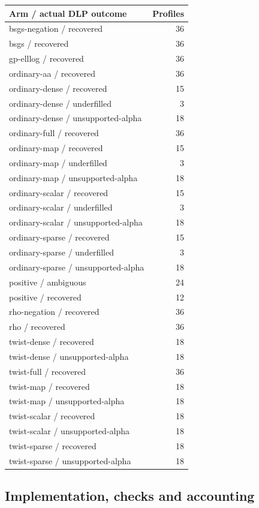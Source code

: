 \documentclass[
  10pt,
]{article}
\begin{document}
\begin{longtable}[]{@{}lr@{}}
\toprule\noalign{}
Arm / actual DLP outcome & Profiles \\
\midrule\noalign{}
\endhead
\bottomrule\noalign{}
\endlastfoot
bsgs-negation / recovered & 36 \\
bsgs / recovered & 36 \\
gp-elllog / recovered & 36 \\
ordinary-aa / recovered & 36 \\
ordinary-dense / recovered & 15 \\
ordinary-dense / underfilled & 3 \\
ordinary-dense / unsupported-alpha & 18 \\
ordinary-full / recovered & 36 \\
ordinary-map / recovered & 15 \\
ordinary-map / underfilled & 3 \\
ordinary-map / unsupported-alpha & 18 \\
ordinary-scalar / recovered & 15 \\
ordinary-scalar / underfilled & 3 \\
ordinary-scalar / unsupported-alpha & 18 \\
ordinary-sparse / recovered & 15 \\
ordinary-sparse / underfilled & 3 \\
ordinary-sparse / unsupported-alpha & 18 \\
positive / ambiguous & 24 \\
positive / recovered & 12 \\
rho-negation / recovered & 36 \\
rho / recovered & 36 \\
twist-dense / recovered & 18 \\
twist-dense / unsupported-alpha & 18 \\
twist-full / recovered & 36 \\
twist-map / recovered & 18 \\
twist-map / unsupported-alpha & 18 \\
twist-scalar / recovered & 18 \\
twist-scalar / unsupported-alpha & 18 \\
twist-sparse / recovered & 18 \\
twist-sparse / unsupported-alpha & 18 \\
\end{longtable}

\subsection{Implementation, checks and
accounting}\label{implementation-checks-and-accounting}
\end{document}
